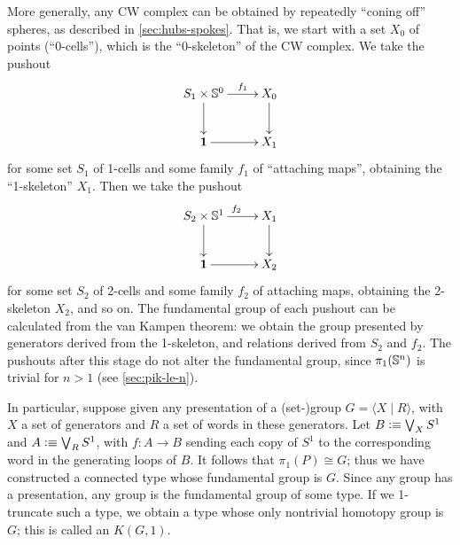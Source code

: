 \begin{eg}
  More generally, any CW complex can be obtained by repeatedly ``coning off'' spheres, as described in \cref{sec:hubs-spokes}.
  That is, we start with a set $X_0$ of points (``0-cells''), which is the ``0-skeleton'' of the CW complex.
  We take the pushout
  \begin{equation*}
    \vcenter{\xymatrix{
        S_1 \times \Sn^0\ar[r]^-{f_1}\ar[d] &
        X_0\ar[d]\\
        \unit \ar[r] &
        X_1
      }}
  \end{equation*}
  for some set $S_1$ of 1-cells and some family $f_1$ of ``attaching maps'', obtaining the ``1-skeleton'' $X_1$.
  Then we take the pushout
  \begin{equation*}
    \vcenter{\xymatrix{
        S_2 \times \Sn^1\ar[r]^{f_2}\ar[d] &
        X_1\ar[d]\\
        \unit \ar[r] &
        X_2
      }}
  \end{equation*}
  for some set $S_2$ of 2-cells and some family $f_2$ of attaching maps, obtaining the 2-skeleton $X_2$, and so on.
  The fundamental group of each pushout can be calculated from the van Kampen theorem: we obtain the group presented by generators derived from the 1-skeleton, and relations derived from $S_2$ and $f_2$.
  The pushouts after this stage do not alter the fundamental group, since $\pi_1(\mathbb{S}^n)$ is trivial for $n>1$ (see \cref{sec:pik-le-n}).
\end{eg}


\begin{eg}\label{eg:kg1}
  In particular, suppose given any presentation of a (set-)group $G = \langle X \mid R \rangle$, with $X$ a set of generators and $R$ a set of words in these generators.
  Let $B\vcentcolon\equiv \bigvee_X S^1$ and $A\vcentcolon\equiv \bigvee_R S^1$, with $f:A\to B$ sending each copy of $S^1$ to the corresponding word in the generating loops of $B$.
  It follows that $\pi_1(P) \cong G$; thus we have constructed a connected type whose fundamental group is $G$.
  Since any group has a presentation, any group is the fundamental group of some type.
  If we 1-truncate such a type, we obtain a type whose only nontrivial homotopy group is $G$; this is called an  $K(G,1)$.%
\end{eg}

